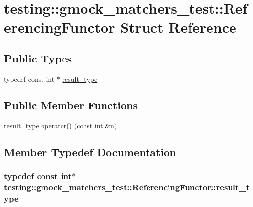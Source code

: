 \hypertarget{structtesting_1_1gmock__matchers__test_1_1ReferencingFunctor}{}\section{testing\+:\+:gmock\+\_\+matchers\+\_\+test\+:\+:Referencing\+Functor Struct Reference}
\label{structtesting_1_1gmock__matchers__test_1_1ReferencingFunctor}
\subsection*{Public Types}
\begin{DoxyCompactItemize}
\item 
typedef const int $\ast$ \hyperlink{structtesting_1_1gmock__matchers__test_1_1ReferencingFunctor_a5856a8175e2f797a6733a363b2834094}{result\+\_\+type}
\end{DoxyCompactItemize}
\subsection*{Public Member Functions}
\begin{DoxyCompactItemize}
\item 
\hyperlink{structtesting_1_1gmock__matchers__test_1_1ReferencingFunctor_a5856a8175e2f797a6733a363b2834094}{result\+\_\+type} \hyperlink{structtesting_1_1gmock__matchers__test_1_1ReferencingFunctor_a149f15ed9afbff28f5c3639c0f3eb255}{operator()} (const int \&n)
\end{DoxyCompactItemize}


\subsection{Member Typedef Documentation}
\subsubsection[{\texorpdfstring{result\+\_\+type}{result_type}}]{\setlength{\rightskip}{0pt plus 5cm}typedef const int$\ast$ {\bf testing\+::gmock\+\_\+matchers\+\_\+test\+::\+Referencing\+Functor\+::result\+\_\+type}}\hypertarget{structtesting_1_1gmock__matchers__test_1_1ReferencingFunctor_a5856a8175e2f797a6733a363b2834094}{}\label{structtesting_1_1gmock__matchers__test_1_1ReferencingFunctor_a5856a8175e2f797a6733a363b2834094}


